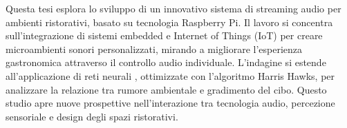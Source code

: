 
%


Questa tesi esplora lo sviluppo di un innovativo sistema di streaming audio per ambienti ristorativi, basato su tecnologia Raspberry Pi. Il lavoro si concentra sull'integrazione di sistemi embedded e Internet of Things (IoT) per creare microambienti sonori personalizzati, mirando a migliorare l'esperienza gastronomica attraverso il controllo audio individuale. L'indagine si estende all'applicazione di reti neurali , ottimizzate con l'algoritmo Harris Hawks, per analizzare la relazione tra rumore ambientale e gradimento del cibo. Questo studio apre nuove prospettive nell'interazione tra tecnologia audio, percezione sensoriale e design degli spazi ristorativi.


